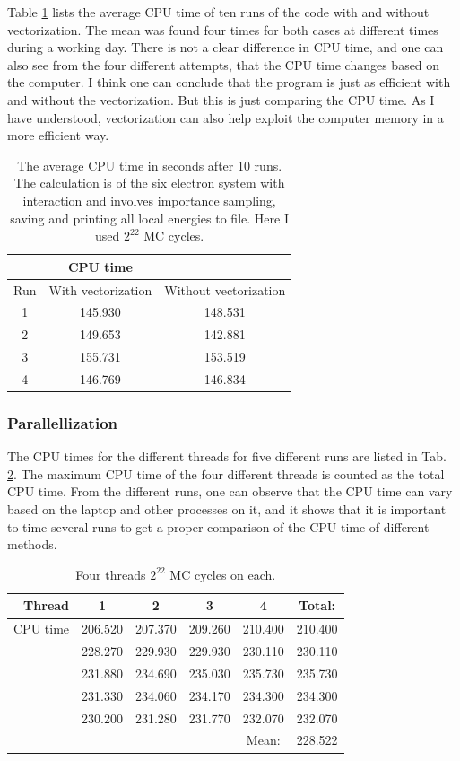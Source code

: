 Table \ref{tab:CPUtime_vectorization} lists the average CPU time of ten runs of the code with and without vectorization. The mean was found four times for both cases at different times during a working day. There is not a clear difference in CPU time, and one can also see from the four different attempts, that the CPU time changes based on the computer. I think one can conclude that the program is just as efficient with and without the vectorization. But this is just comparing the CPU time. As I have understood, vectorization can also help exploit the computer memory in a more efficient way. 

\begin{table}[H]\caption{The average CPU time in seconds after 10 runs. The calculation is of the six electron system with interaction and involves importance sampling, saving and printing all local energies to file. Here I used $2^{22}$ MC cycles. }\label{tab:CPUtime_vectorization}
\center
\begin{tabular}{c|cc}
 & CPU time & \\ \hline
Run & With vectorization & Without vectorization \\ \hline
1 & 145.930 & 148.531 \\
2 & 149.653 & 142.881 \\
3 & 155.731 & 153.519 \\
4 & 146.769 & 146.834 \\
\end{tabular}
\end{table}

\subsubsection{Parallellization}

The CPU times for the different threads for five different runs are listed in Tab. \ref{tab:CPUtime_treads}. The maximum CPU time of the four different threads is counted as the total CPU time. From the different runs, one can observe that the CPU time can vary based on the laptop and other processes on it, and it shows that it is important to time several runs to get a proper comparison of the CPU time of different methods. 

\begin{table}[H]\caption{Four threads $2^{22}$ MC cycles on each.}\label{tab:CPUtime_treads}
\center
\begin{tabular}{r|cccc|c}
Thread & 1 & 2 & 3 & 4 & Total: \\ \hline
CPU time & 206.520 & 207.370 & 209.260 & 210.400 & 210.400 \\
& 228.270 & 229.930 & 229.930 & 230.110 & 230.110 \\
& 231.880 & 234.690 & 235.030 & 235.730 & 235.730 \\
& 231.330 & 234.060 & 234.170 & 234.300 & 234.300 \\
& 230.200 & 231.280 & 231.770 & 232.070 & 232.070 \\ \hline
 &  &  &  & Mean: & 228.522 \\
\end{tabular}\\
\end{table}

